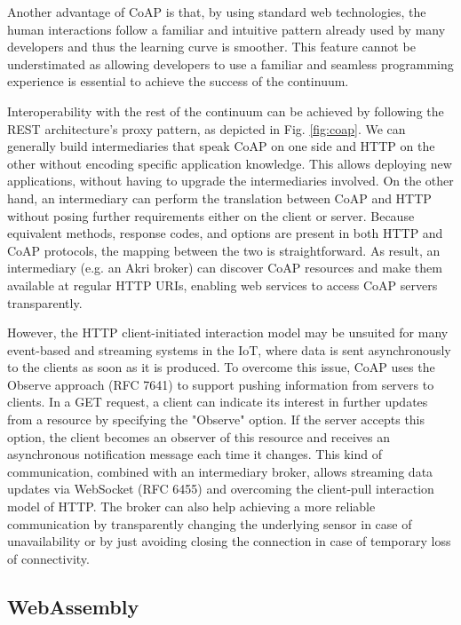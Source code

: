 Another advantage of CoAP is that, by using standard web technologies, the human interactions follow a familiar and intuitive pattern already used by many developers and thus the learning curve is smoother. This feature cannot be understimated as allowing developers to use a familiar and seamless programming experience is essential to achieve the success of the continuum.

Interoperability with the rest of the continuum can be achieved by following the REST architecture's proxy pattern, as depicted in Fig. \ref{fig:coap}. We can generally build intermediaries that speak CoAP on one side and HTTP on the other without encoding specific application knowledge. This allows deploying new applications, without having to upgrade the intermediaries involved. On the other hand, an intermediary can perform the translation between CoAP and HTTP without posing further requirements either on the client or server. Because equivalent methods, response codes, and options are present in both HTTP and CoAP protocols, the mapping between the two is straightforward. As result, an intermediary (e.g. an Akri broker) can discover CoAP resources and make them available at regular HTTP URIs, enabling web services to access CoAP servers transparently.

However, the HTTP client-initiated interaction model may be unsuited for many event-based and streaming systems in the IoT, where data is sent asynchronously to the clients as soon as it is produced. To overcome this issue, CoAP uses the Observe approach (RFC 7641) to support pushing information from servers to clients. In a GET request, a client can indicate its interest in further updates from a resource by specifying the "Observe" option. If the server accepts this option, the client becomes an observer of this resource and receives an asynchronous notification message each time it changes. This kind of communication, combined with an intermediary broker, allows streaming data updates via WebSocket (RFC 6455) and overcoming the client-pull interaction model of HTTP. The broker can also help achieving a more reliable communication by transparently changing the underlying sensor in case of unavailability or by just avoiding closing the connection in case of temporary loss of connectivity.

\subsection{WebAssembly}
\label{sec:webassembly}

